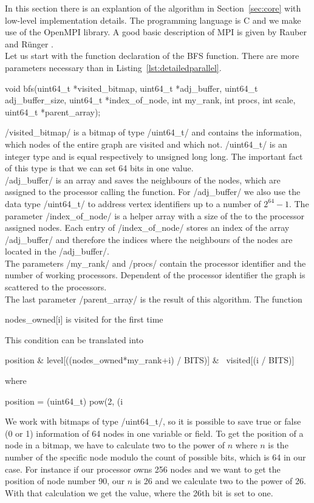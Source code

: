 \documentclass[12pt,a4paper]{article}
\begin{document}
In this section there is an explantion of the algorithm in Section~\ref{sec:core} with low-level implementation details. The programming language is C and we make use of the OpenMPI library. A good basic description of MPI is given by Rauber and R{\"u}nger \cite{rauber}. \\
Let us start with the function declaration of the BFS function. There are more parameters necessary than in Listing~\ref{lst:detailedparallel}.
\begin{ccode}
void bfs(uint64_t *visited_bitmap, uint64_t *adj_buffer, uint64_t adj_buffer_size, uint64_t *index_of_node, int my_rank, int procs, int scale, uint64_t *parent_array);
\end{ccode}
\cinline/visited_bitmap/ is a bitmap of type \cinline/uint64_t/ and contains the information, which nodes of the entire graph are visited and which not. \cinline/uint64_t/ is an integer type and is equal respectively to unsigned long long. The important fact of this type is that we can set 64 bits in one value. \\ 
\cinline/adj_buffer/ is an array and saves the neighbours of the nodes, which are assigned to the processor calling the function. For \cinline/adj_buffer/ we also use the data type \cinline/uint64_t/ to address vertex identifiers up to a number of \(2^{64}-1\). The parameter \cinline/index_of_node/ is a helper array with a size of the to the processor assigned nodes. Each entry of \cinline/index_of_node/ stores an index of the array \cinline/adj_buffer/ and therefore the indices where the neighbours of the nodes are located in the \cinline/adj_buffer/. \\
The parameters \cinline/my_rank/ and \cinline/procs/ contain the processor identifier and the number of working processors. Dependent of the processor identifier the graph is scattered to the processors.\\
The last parameter \cinline/parent_array/ is the result of this algorithm.
The function 
\begin{ccode}
nodes_owned[i] is visited for the first time
\end{ccode}
This condition can be translated into
\begin{ccode}
position & level[((nodes_owned*my_rank+i) / BITS)] & ~visited[(i / BITS)]
\end{ccode}
where 
\begin{ccode}
position = (uint64_t) pow(2, (i %
\end{ccode}
We work with bitmaps of type \cinline/uint64_t/, so it is possible to save true or false (0 or 1) information of 64 nodes in one variable or field. To get the position of a node in a bitmap, we have to calculate two to the power of \(n\) where \(n\) is the number of the specific node modulo the count of possible bits, which is 64 in our case. For instance if our processor owns 256 nodes and we want to get the position of node number 90, our \(n\) is 26 and we calculate two to the power of 26. With that calculation we get the value, where the 26th bit is set to one.\\
\end{document}
